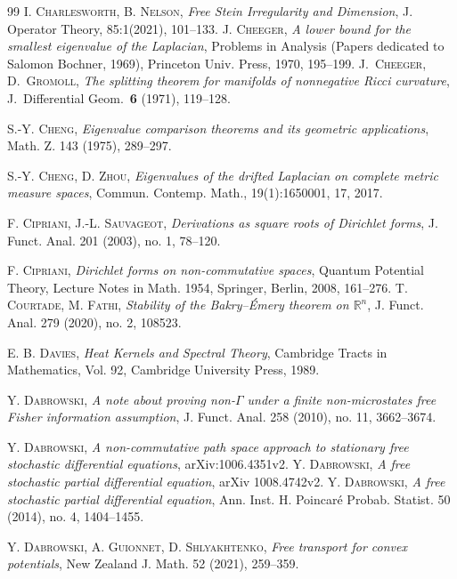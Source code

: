 \documentclass[10pt,a4paper,reqno]{amsart}
\begin{document}
\begin{thebibliography}{99}
\textsc{I. Charlesworth, B. Nelson}, 
\textit{Free Stein Irregularity and Dimension}, 
J. Operator Theory, 85:1(2021), 101–133.
\textsc{J. Cheeger}, 
\textit{A lower bound for the smallest eigenvalue of the Laplacian}, 
Problems in Analysis (Papers dedicated to Salomon Bochner, 1969), Princeton Univ. Press, 1970, 195–199.
\textsc{J.~Cheeger, D.~Gromoll},
\textit{The splitting theorem for manifolds of nonnegative Ricci curvature},
J.\ Differential Geom.\ \textbf{6} (1971), 119--128.

\textsc{S.-Y. Cheng}, 
\textit{Eigenvalue comparison theorems and its geometric applications}, 
Math. Z. 143 (1975), 289–297.

\textsc{S.-Y. Cheng, D. Zhou}, 
\textit{Eigenvalues of the drifted Laplacian on complete metric measure spaces}, 
Commun. Contemp. Math., 19(1):1650001, 17, 2017.

\textsc{F. Cipriani, J.-L. Sauvageot}, 
\textit{Derivations as square roots of Dirichlet forms}, 
J. Funct. Anal. 201 (2003), no. 1, 78–120.

\textsc{F. Cipriani}, 
\textit{Dirichlet forms on non-commutative spaces}, 
Quantum Potential Theory, Lecture Notes in Math. 1954, Springer, Berlin, 2008, 161–276.
\textsc{T. Courtade, M. Fathi}, 
\textit{Stability of the Bakry–Émery theorem on $\mathbb{R}^n$}, 
J. Funct. Anal. 279 (2020), no. 2, 108523.

\textsc{E. B. Davies}, 
\textit{Heat Kernels and Spectral Theory}, 
Cambridge Tracts in Mathematics, Vol. 92, Cambridge University Press, 1989.

\textsc{Y. Dabrowski}, 
\textit{A note about proving non-$\Gamma$ under a finite non-microstates free Fisher information assumption}, 
J. Funct. Anal. 258 (2010), no. 11, 3662–3674.

\textsc{Y. Dabrowski}, 
\textit{A non-commutative path space approach to stationary free stochastic differential equations}, 
arXiv:1006.4351v2.
\textsc{Y. Dabrowski}, 
\textit{A free stochastic partial differential equation}, 
arXiv 1008.4742v2.
\textsc{Y. Dabrowski}, 
\textit{A free stochastic partial differential equation}, 
Ann. Inst. H. Poincaré Probab. Statist. 50 (2014), no. 4, 1404–1455.


\textsc{Y. Dabrowski, A. Guionnet, D. Shlyakhtenko}, 
\textit{Free transport for convex potentials}, 
New Zealand J. Math. 52 (2021), 259–359.


\end{thebibliography}
\end{document}
